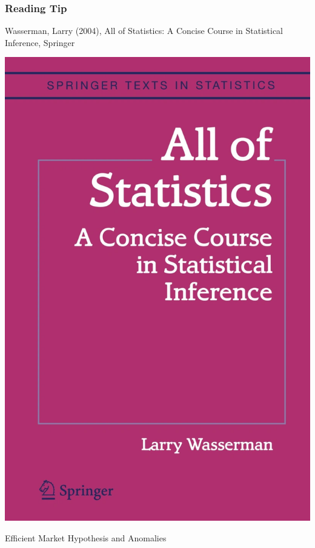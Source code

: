 \documentclass[xcolor=dvipsnames, english, 8pt]{beamer}
\begin{document}
\begin{frame}
    \frametitle{Reading Tip}
Wasserman, Larry (2004), All of Statistics: A Concise Course in Statistical Inference, Springer\vspace{0.35cm}\\
\begin{center}

    \includegraphics[scale=0.15]{Wasserman.jpg}
\end{center}
\end{frame}


\begin{frame}[label=EMH]
    \begin{center}
        {\color{ubRed} \Huge{Efficient Market Hypothesis and Anomalies}}
    \end{center}
\end{frame}
\end{document}
